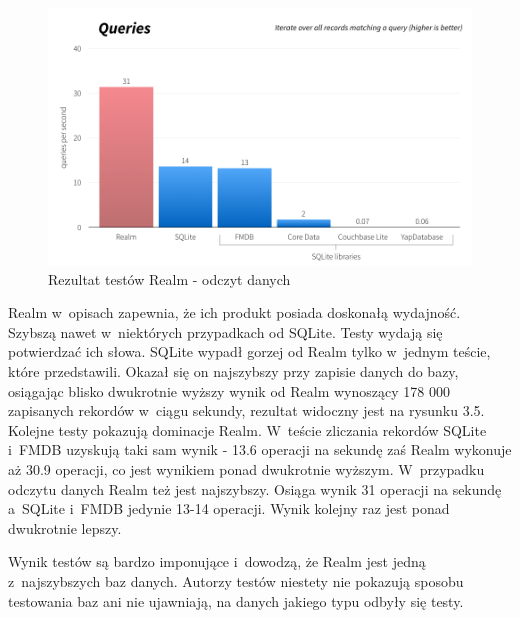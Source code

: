\begin{figure}
\centering
	\includegraphics[width=\linewidth]{img/realm_query_test.png}
	\caption{Rezultat testów Realm - odczyt danych}
	\label{fig: realm_query_test}
\end{figure}
\clearpage

Realm w~opisach zapewnia, że ich produkt posiada doskonałą wydajność. Szybszą nawet w~niektórych przypadkach od SQLite. Testy wydają się potwierdzać ich słowa. SQLite wypadł gorzej od Realm tylko w~jednym teście, które przedstawili. Okazał się on najszybszy przy zapisie danych do bazy, osiągając blisko dwukrotnie wyższy wynik od Realm wynoszący 178 000 zapisanych rekordów w~ciągu sekundy, rezultat widoczny jest na rysunku 3.5. Kolejne testy pokazują dominacje Realm. W~teście zliczania rekordów SQLite i~FMDB uzyskują taki sam wynik - 13.6 operacji na sekundę zaś Realm wykonuje aż 30.9 operacji, co jest wynikiem ponad dwukrotnie wyższym. W~przypadku odczytu danych Realm też jest najszybszy. Osiąga wynik 31 operacji na sekundę a~SQLite i~FMDB jedynie 13-14 operacji. Wynik kolejny raz jest ponad dwukrotnie lepszy. \par 
Wynik testów są bardzo imponujące i~dowodzą, że Realm jest jedną z~najszybszych baz danych. Autorzy testów niestety nie pokazują sposobu testowania baz ani nie ujawniają, na danych jakiego typu odbyły się testy.